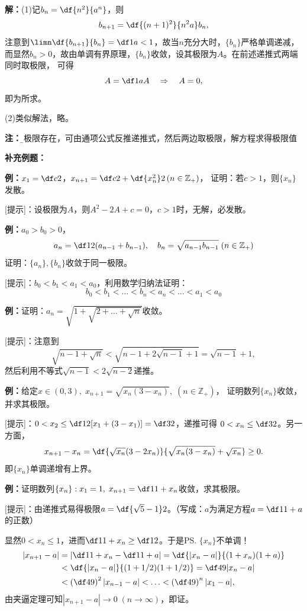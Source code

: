 {\bf 解：}(1)\;记$b_n=\df{n^2}{a^n}$，则
$$b_{n+1}=\df{(n+1)^2}{n^2a}b_n,$$
注意到$\limn\df{b_{n+1}}{b_n}=\df1a<1$，故当$n$充分大时，$\{b_n\}$严格单调递减，
而显然$b_n>0$，故由单调有界原理，$\{b_n\}$收敛，设其极限为$A$。在前述递推式两端同时取极限，
可得
$$A=\df1aA\quad\Rightarrow\quad A=0,$$
即为所求。

(2)\;类似解法，略。

{\bf 注：}{\b 若极限存在，可由通项公式反推递推式，然后两边取极限，解方程求得极限值}

{\bf 补充例题：}

{\bf 例：}$x_1=\df c2$，$x_{n+1}=\df c2+\df{x_n^2}2\,(n\in\mathbb{Z}_+)$，
证明：若$c>1$，则$\{x_n\}$发散。

[提示]：设极限为$A$，则$A^2-2A+c=0$，$c>1$时，无解，必发散。

{\bf 例：}$a_0>b_0>0$，
$$a_n=\df12(a_{n-1}+b_{n-1}),\quad
b_n=\sqrt{a_{n-1}b_{n-1}}\;(n\in\mathbb{Z}_+)$$
证明：$\{a_n\},\{b_n\}$收敛于同一极限。

[提示]：$b_0<b_1<a_1<a_0$，利用数学归纳法证明：
$$b_0<b_1<\ldots<b_n<a_n<\ldots<a_1<a_0$$

{\bf 例：}证明：$a_n=\sqrt{1+\sqrt{2+\ldots+\sqrt{n}}}$收敛。

[提示]：注意到
$$\sqrt{n-1+\sqrt n}<\sqrt{n-1+2\sqrt{n-1}+1}=\sqrt{n-1}+1,$$
然后利用不等式$\sqrt{n-1}<2\sqrt{n-2}$递推。

{\bf 例：}给定$x\in(0,3),\; x_{n+1}=\sqrt{x_n(3-x_n)},\;(n\in\mathbb{Z}_+)$，
证明数列$\{x_n\}$收敛，并求其极限。

[提示]：$0<x_2\leq\df12[x_1+(3-x_1)]=\df32$，递推可得
$0<x_n\leq\df32$。另一方面，
$$x_{n+1}-x_n=\df{\sqrt{x_n}(3-2x_n)}{\sqrt{x_n(3-x_n)}+\sqrt{x_n}}\geq 0.$$
即$\{x_n\}$单调递增有上界。

{\bf 例：}证明数列$\{x_n\}:x_1=1,\;x_{n+1}=\df1{1+x_n}$收敛，求其极限。

[提示]：由递推式易得极限$a=\df{\sqrt5-1}2$。（写成：$a$为满足方程$a=\df1{1+a}$的正数）

显然$0<x_n\leq1$，进而$\df1{1+x_n}\geq\df12$。于是\ps{$\{x_n\}$不单调！}
\begin{align}
	|x_{n+1}-a|&=\left|\df1{1+x_n}-\df1{1+a}\right|=\df{|x_n-a|}{(1+x_n)(1+a)}\notag\\
	&<\df{|x_n-a|}{(1+1/2)(1+1/2)}=\df49|x_n-a|\notag\\
	&<\left(\df49\right)^2|x_{n-1}-a|<\ldots<\left(\df49\right)^{n}|x_1-a|,\notag
\end{align}
由夹逼定理可知$|x_{n+1}-a|\to0\;(n\to\infty)$，即证。

